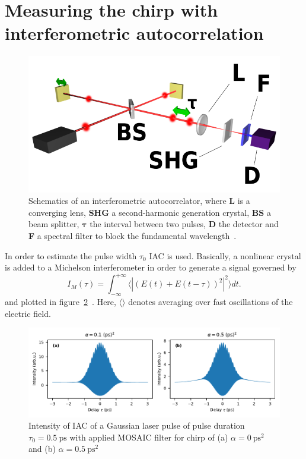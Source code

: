 \section{Measuring the chirp with interferometric autocorrelation}
\begin{figure}[H]
	\centering
	\includegraphics[width=0.6\linewidth]{figures/chirp/Optical-interferometric-autocorrelation-setup.png}
	\caption[Schematics of an interferometric autocorrelator]{Schematics of an interferometric autocorrelator, where \textbf{L} is a converging lens, \textbf{SHG} a second-harmonic generation crystal, \textbf{BS} a beam splitter, $\mathbf{\tau}$ the interval between two pulses, \textbf{D} the detector and \textbf{F} a spectral filter to block the fundamental wavelength~\cite{noauthor_optical_nodate}.}
	\label{fig:optical-field-autocorrelation-setup}
\end{figure}
In order to estimate the pulse width $\tau_0$ \ac{IAC} is used.
Basically, a nonlinear crystal is added to a Michelson interferometer in order to generate a signal governed by
\begin{equation}
\label{eq:i-m-integral}
I_M(\tau) = \int_{-\infty}^{+\infty}\langle|(E(t)+E(t-\tau))^2|^2\rangle dt.
\end{equation}
and plotted in figure~\ref{fig:imgausschirpwithoutslitwithoutmosaic}~\cite{diels_ultrashort_2006}.
Here, $\langle \rangle$ denotes averaging over fast oscillations of the electric field.
\begin{figure}[H]
	\centering
	\includegraphics[width=\linewidth]{figures/chirp/plots/I_M_gauss_chirp_without_slit_without_MOSAIC}
	\caption{Intensity of IAC of a Gaussian laser pulse of pulse duration $\tau_0=\SI{0.5}{\pico \second}$ with applied MOSAIC filter for chirp of (a) $\alpha = \SI{0}{\pico \second \squared}$ and (b) $\alpha = \SI{0.5}{\pico \second \squared}$}
	\label{fig:imgausschirpwithoutslitwithoutmosaic}
\end{figure}
